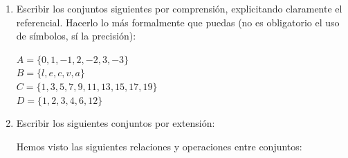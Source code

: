 \documentclass[12pt]{article}
\theoremstyle{definition}
\begin{document}
\begin{enumerate}
\item Escribir los conjuntos siguientes por comprensión, explicitando claramente el referencial. Hacerlo lo más formalmente que puedas (no es obligatorio el uso de símbolos, sí la precisión):
\begin{multicols}{2}
$A = \{ 0, 1, -1, 2, -2, 3, -3 \}$ \\
$ B = \{ l, e, c, v, a \}$  \\
$C = \{ 1, 3, 5, 7, 9, 11, 13, 15, 17, 19 \}$\\
$D = \{1, 2, 3, 4, 6, 12 \}$   
\end{multicols}

\item Escribir los siguientes conjuntos por extensión:\\

\noindent
Hemos visto las siguientes relaciones y operaciones entre conjuntos:


\end{enumerate}
\end{document}
